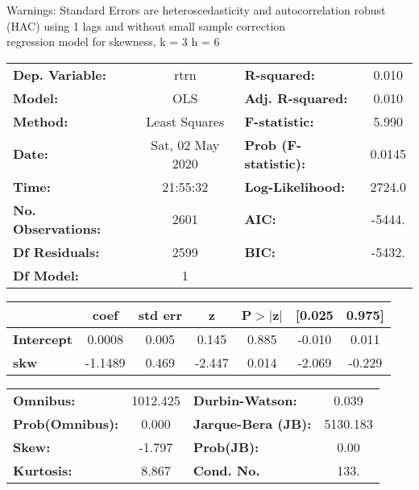 Warnings: \newline
 [1] Standard Errors are heteroscedasticity and autocorrelation robust (HAC) using 1 lags and without small sample correction\\ 

regression model for skewness, k = 3 h = 6\begin{center}
\begin{tabular}{lclc}
\toprule
\textbf{Dep. Variable:}    &       rtrn       & \textbf{  R-squared:         } &     0.010   \\
\textbf{Model:}            &       OLS        & \textbf{  Adj. R-squared:    } &     0.010   \\
\textbf{Method:}           &  Least Squares   & \textbf{  F-statistic:       } &     5.990   \\
\textbf{Date:}             & Sat, 02 May 2020 & \textbf{  Prob (F-statistic):} &   0.0145    \\
\textbf{Time:}             &     21:55:32     & \textbf{  Log-Likelihood:    } &    2724.0   \\
\textbf{No. Observations:} &        2601      & \textbf{  AIC:               } &    -5444.   \\
\textbf{Df Residuals:}     &        2599      & \textbf{  BIC:               } &    -5432.   \\
\textbf{Df Model:}         &           1      & \textbf{                     } &             \\
\bottomrule
\end{tabular}
\begin{tabular}{lcccccc}
                   & \textbf{coef} & \textbf{std err} & \textbf{z} & \textbf{P$> |$z$|$} & \textbf{[0.025} & \textbf{0.975]}  \\
\midrule
\textbf{Intercept} &       0.0008  &        0.005     &     0.145  &         0.885        &       -0.010    &        0.011     \\
\textbf{skw}       &      -1.1489  &        0.469     &    -2.447  &         0.014        &       -2.069    &       -0.229     \\
\bottomrule
\end{tabular}
\begin{tabular}{lclc}
\textbf{Omnibus:}       & 1012.425 & \textbf{  Durbin-Watson:     } &    0.039  \\
\textbf{Prob(Omnibus):} &   0.000  & \textbf{  Jarque-Bera (JB):  } & 5130.183  \\
\textbf{Skew:}          &  -1.797  & \textbf{  Prob(JB):          } &     0.00  \\
\textbf{Kurtosis:}      &   8.867  & \textbf{  Cond. No.          } &     133.  \\
\bottomrule
\end{tabular}
\end{center}

